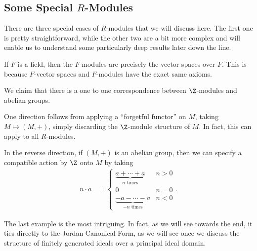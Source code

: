 \documentclass[10pt]{mypackage}
\begin{document}
\subsection{Some Special $R$-Modules}%
There are three special cases of $R$-modules that we will discuss here. The first one is pretty straightforward, while the other two are a bit more complex and will enable us to understand some particularly deep results later down the line.
\begin{example}
  If $F$ is a field, then the $F$-modules are precisely the vector spaces over $F$. This is because $F$-vector spaces and $F$-modules have the exact same axioms.
\end{example}
\begin{example}
  We claim that there is a one to one correspondence between $\Z$-modules and abelian groups.\newline

  One direction follows from applying a ``forgetful functor'' on $M$, taking $M\mapsto \left( M,+ \right)$, simply discarding the $\Z$-module structure of $M$. In fact, this can apply to all $R$-modules.\newline

  In the reverse direction, if $\left( M,+ \right)$ is an abelian group, then we can specify a compatible action by $\Z$ onto $M$ by taking
  \begin{align*}
    n\cdot a &= \begin{cases}
      \underbrace{a + \cdots + a}_{n\text{ times}} & n > 0\\
      0 & n = 0\\
      \underbrace{-a-\cdots-a}_{-n\text{ times}} & n < 0
    \end{cases}.
  \end{align*}
\end{example}
The last example is the most intriguing. In fact, as we will see towards the end, it ties directly to the Jordan Canonical Form, as we will see once we discuss the structure of finitely generated ideals over a principal ideal domain.
\end{document}
